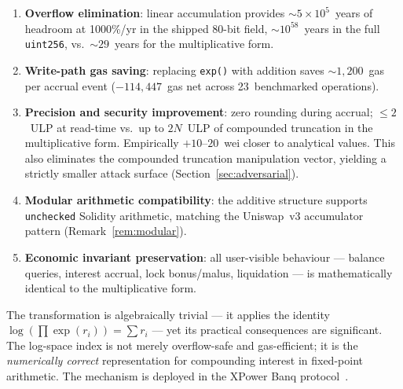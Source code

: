 \documentclass[10pt,a4paper,twocolumn]{article}
\begin{document}
\begin{enumerate}[leftmargin=*, nosep]
\item \textbf{Overflow elimination}: linear accumulation provides $\sim 5 \times 10^5$~years of headroom at 1000\%/yr in the shipped 80-bit field, $\sim 10^{58}$~years in the full \texttt{uint256}, vs.\ ${\sim}29$~years for the multiplicative form.

\item \textbf{Write-path gas saving}: replacing \texttt{exp()} with addition saves ${\sim}1{,}200$~gas per accrual event ($-114{,}447$~gas net across 23~benchmarked operations).

\item \textbf{Precision and security improvement}: zero rounding during accrual; $\leq 2$~ULP at read-time vs.\ up to $2N$~ULP of compounded truncation in the multiplicative form. Empirically $+10$--$20$~wei closer to analytical values. This also eliminates the compounded truncation manipulation vector, yielding a strictly smaller attack surface (Section~\ref{sec:adversarial}).

\item \textbf{Modular arithmetic compatibility}: the additive structure supports \texttt{unchecked} Solidity arithmetic, matching the Uniswap~v3 accumulator pattern (Remark~\ref{rem:modular}).

\item \textbf{Economic invariant preservation}: all user-visible behaviour --- balance queries, interest accrual, lock bonus/malus, liquidation --- is mathematically identical to the multiplicative form.
\end{enumerate}

The transformation is algebraically trivial --- it applies the identity $\log(\prod \exp(r_i)) = \sum r_i$ --- yet its practical consequences are significant. The log-space index is not merely overflow-safe and gas-efficient; it is the \emph{numerically correct} representation for compounding interest in fixed-point arithmetic. The mechanism is deployed in the XPower Banq protocol~\cite{wp}.
\end{document}
